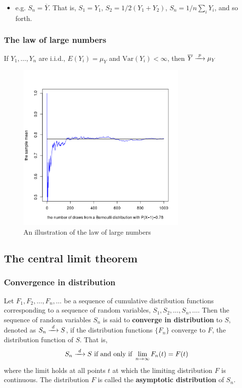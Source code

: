 \documentclass[a4paper,11pt]{article}
\newcommand{\var}{\mathrm{Var}}
\begin{document}
\begin{itemize}
\item e.g. \(S_n = \overline{Y}\). That is, \(S_1=Y_1\), \(S_2=1/2(Y_1+Y_2)\),
\(S_n=1/n\sum_i Y_i\), and so forth.
\end{itemize}

\subsubsection*{The law of large numbers}
\label{sec:org7f66606}
If \(Y_1, \ldots, Y_n\) are i.i.d., \(E(Y_i)=\mu_Y\) and \(\var(Y_i) <
\infty\), then \(\overline{Y} \xrightarrow{\text{ \textit p }} \mu_Y\)

\begin{figure}[htbp]
\centering
\includegraphics[width=0.75\textwidth]{figure/demo_lln.png}
\caption{An illustration of the law of large numbers}
\end{figure}

\subsection{The central limit theorem}
\label{sec:org9e9f985}
\subsubsection*{Convergence in distribution}
\label{sec:org09b3935}
Let \(F_1, F_2, \ldots, F_n, \ldots\) be a sequence of cumulative
distribution functions corresponding to a sequence of random
variables, \(S_1, S_2, \ldots, S_n, \ldots\). Then the sequence of
random variables \(S_n\) is said to \textbf{converge in distribution} to \(S\),
denoted as \(S_n \xrightarrow{\text{ \textit d }} S\), if the
distribution functions \(\{F_n\}\) converge to \(F\), the distribution
function of \(S\). That is,
\[ S_n \xrightarrow{\text{ \textit d }} S \text{ if and only if } \lim_{n
\rightarrow \infty}F_n(t)=F(t) \]
where the limit holds at all points \(t\) at which the limiting
distribution \(F\) is continuous. The distribution \(F\) is called the
\textbf{asymptotic distribution} of \(S_n\).
\end{document}
